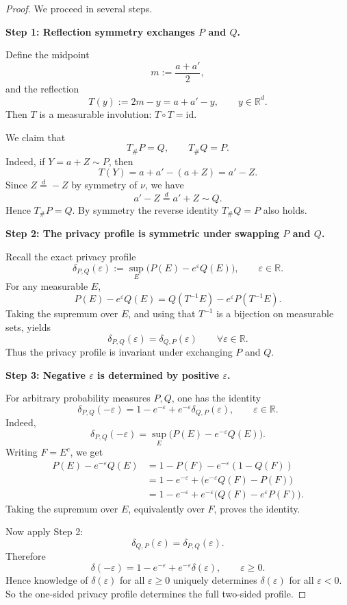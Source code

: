\documentclass[11pt]{article}
\begin{document}
\begin{proof}
We proceed in several steps.

\medskip
\noindent
\textbf{Step 1: Reflection symmetry exchanges \(P\) and \(Q\).}

Define the midpoint
\[
m:=\frac{a+a'}{2},
\]
and the reflection
\[
T(y):=2m-y=a+a'-y,\qquad y\in\mathbb R^d.
\]
Then \(T\) is a measurable involution: \(T\circ T=\mathrm{id}\).

We claim that
\[
T_\# P = Q,\qquad T_\# Q = P.
\]
Indeed, if \(Y=a+Z\sim P\), then
\[
T(Y)=a+a'-(a+Z)=a'-Z.
\]
Since \(Z\stackrel d= -Z\) by symmetry of \(\nu\), we have
\[
a'-Z \stackrel d= a'+Z \sim Q.
\]
Hence \(T_\#P=Q\). By symmetry the reverse identity \(T_\#Q=P\) also holds.

\medskip
\noindent
\textbf{Step 2: The privacy profile is symmetric under swapping \(P\) and \(Q\).}

Recall the exact privacy profile
\[
\delta_{P,Q}(\varepsilon):=\sup_{E}\bigl(P(E)-e^\varepsilon Q(E)\bigr),\qquad \varepsilon\in\mathbb R.
\]
For any measurable \(E\),
\[
P(E)-e^\varepsilon Q(E)
=Q(T^{-1}E)-e^\varepsilon P(T^{-1}E).
\]
Taking the supremum over \(E\), and using that \(T^{-1}\) is a bijection on measurable sets, yields
\[
\delta_{P,Q}(\varepsilon)=\delta_{Q,P}(\varepsilon)\qquad \forall \varepsilon\in\mathbb R.
\]
Thus the privacy profile is invariant under exchanging \(P\) and \(Q\).

\medskip
\noindent
\textbf{Step 3: Negative \(\varepsilon\) is determined by positive \(\varepsilon\).}

For arbitrary probability measures \(P,Q\), one has the identity
\[
\delta_{P,Q}(-\varepsilon)
=
1-e^{-\varepsilon}+e^{-\varepsilon}\delta_{Q,P}(\varepsilon),
\qquad \varepsilon\in\mathbb R.
\]
Indeed,
\[
\delta_{P,Q}(-\varepsilon)
=
\sup_E \bigl(P(E)-e^{-\varepsilon}Q(E)\bigr).
\]
Writing \(F=E^c\), we get
\begin{align*}
P(E)-e^{-\varepsilon}Q(E)
&=1-P(F)-e^{-\varepsilon}(1-Q(F))\\
&=1-e^{-\varepsilon}+\bigl(e^{-\varepsilon}Q(F)-P(F)\bigr)\\
&=1-e^{-\varepsilon}+e^{-\varepsilon}\bigl(Q(F)-e^\varepsilon P(F)\bigr).
\end{align*}
Taking the supremum over \(E\), equivalently over \(F\), proves the identity.

Now apply Step 2:
\[
\delta_{Q,P}(\varepsilon)=\delta_{P,Q}(\varepsilon).
\]
Therefore
\[
\boxed{
\delta(-\varepsilon)=1-e^{-\varepsilon}+e^{-\varepsilon}\delta(\varepsilon),
\qquad \varepsilon\ge 0.
}
\]
Hence knowledge of \(\delta(\varepsilon)\) for all \(\varepsilon\ge 0\) uniquely determines \(\delta(\varepsilon)\) for all \(\varepsilon<0\). So the one-sided privacy profile determines the full two-sided profile.


\end{proof}
\end{document}
